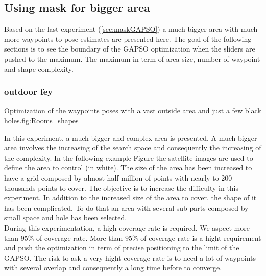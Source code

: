 	\subsection{Using mask for bigger area}
	Based on the last experiment (\ref{sec:maskGAPSO}) a much bigger area with much more waypoints to pose estimates are presented here. The goal of the following sections is to see the boundary of the  GAPSO optimization when the sliders are pushed to the maximum. The maximum in term of area size, number of waypoint and shape complexity.
	
		\subsubsection{outdoor fey}\label{sec:fey_map}

\begin{mfigures}[!]{ Optimization of the waypoints poses with a vast outside area and just a few  black holes.}{fig:Rooms_shapes} \centering
{}
\hspace{1cm}
\hspace{1cm}
\tabsimuposeFley
\end{mfigures}


In this experiment, a much bigger and complex area is presented.
		A much bigger area involves the increasing of the search space and consequently the increasing of the complexity. 
In the following example Figure  the satellite images are used to define the area to control (in white). The size of the area has been increased to have a grid composed by almost half million of points with nearly to 200 thousands points to cover. 
The objective is to increase the difficulty in this experiment. In addition to the increased size of the area to cover, the shape of it has been complicated. To do that an area with several sub-parts composed by small space and hole has been selected.\\
During this experimentation, a high coverage rate is required. We aspect more than $95\%$ of coverage rate. More than $95\%$ of coverage rate is a hight requirement and push the optimization in term of precise positioning to the limit of the GAPSO. The risk to ask a very hight coverage rate is to need a lot of waypoints with several overlap and consequently a long time before to converge. 

